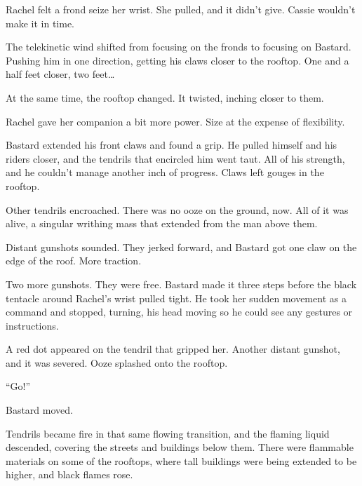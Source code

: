 Rachel felt a frond seize her wrist.  She pulled, and it didn't give.  Cassie wouldn't make it in time.



The telekinetic wind shifted from focusing on the fronds to focusing on Bastard.  Pushing him in one direction, getting his claws closer to the rooftop.  One and a half feet closer, two feet\ldots



At the same time, the rooftop changed.  It twisted, inching closer to them.



Rachel gave her companion a bit more power.  Size at the expense of flexibility.



Bastard extended his front claws and found a grip.  He pulled himself and his riders closer, and the tendrils that encircled him went taut.  All of his strength, and he couldn't manage another inch of progress.  Claws left gouges in the rooftop.



Other tendrils encroached.  There was no ooze on the ground, now.  All of it was alive, a singular writhing mass that extended from the man above them.



Distant gunshots sounded.  They jerked forward, and Bastard got one claw on the edge of the roof.  More traction.



Two more gunshots.  They were free.  Bastard made it three steps before the black tentacle around Rachel's wrist pulled tight.  He took her sudden movement as a command and stopped, turning, his head moving so he could see any gestures or instructions.



A red dot appeared on the tendril that gripped her.  Another distant gunshot, and it was severed.  Ooze splashed onto the rooftop.



``Go!''



Bastard moved.



Tendrils became fire in that same flowing transition, and the flaming liquid descended, covering the streets and buildings below them.  There were flammable materials on some of the rooftops, where tall buildings were being extended to be higher, and black flames rose.



